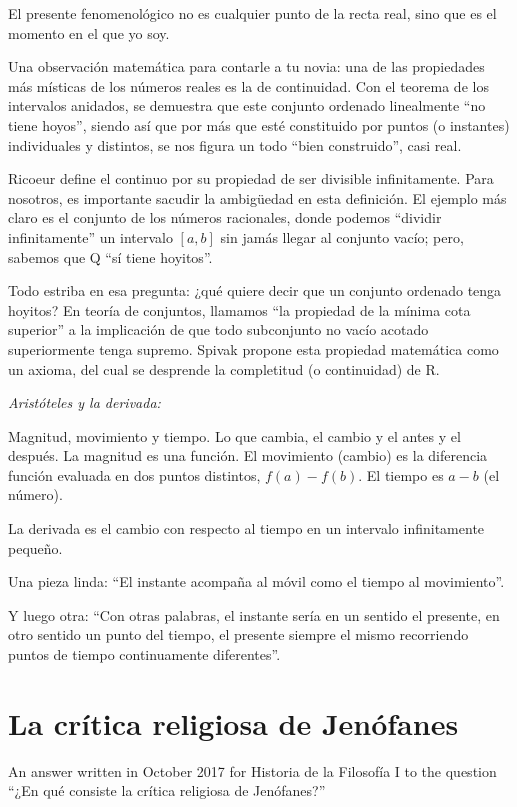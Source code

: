 El presente fenomenológico no es cualquier
punto de la recta real, sino que es el
momento en el que yo soy.

Una observación matemática para contarle a tu
novia: una de las propiedades más místicas de
los números reales es la de continuidad. Con
el teorema de los intervalos anidados, se
demuestra que este conjunto ordenado
linealmente ``no tiene hoyos'', siendo así
que por más que esté constituido por puntos
(o instantes) individuales y distintos, se
nos figura un todo ``bien construido'', casi
real.

Ricoeur define el continuo por su propiedad
de ser divisible infinitamente. Para
nosotros, es importante sacudir la ambigüedad
en esta definición. El ejemplo más claro es
el conjunto de los números racionales, donde
podemos ``dividir infinitamente'' un
intervalo $[a,b]$ sin jamás llegar al
conjunto vacío; pero, sabemos que Q ``sí
tiene hoyitos''.

Todo estriba en esa pregunta: ¿qué quiere
decir que un conjunto ordenado tenga hoyitos?
En teoría de conjuntos, llamamos ``la
propiedad de la mínima cota superior'' a la
implicación de que todo subconjunto no vacío
acotado superiormente tenga supremo. Spivak
propone esta propiedad matemática como un
axioma, del cual se desprende la completitud
(o continuidad) de R.

\medskip\noindent\emph{Aristóteles y la
derivada:}

Magnitud, movimiento y tiempo. Lo que cambia,
el cambio y el antes y el después. La
magnitud es una función. El movimiento
(cambio) es la diferencia función evaluada en
dos puntos distintos, $f(a)-f(b)$. El tiempo
es $a-b$ (el número).

La derivada es el cambio con respecto al
tiempo en un intervalo infinitamente pequeño.

Una pieza linda: ``El instante acompaña al
móvil como el tiempo al movimiento''.

Y luego otra: ``Con otras palabras, el
instante sería en un sentido el presente, en
otro sentido un punto del tiempo, el presente
siempre el mismo recorriendo puntos de tiempo
continuamente diferentes''.

\section{La crítica religiosa de Jenófanes}
\label{section-jenofanes}

An answer written in October 2017 for
Historia de la Filosofía I to the question
``¿En qué consiste la crítica religiosa de
Jenófanes?''

